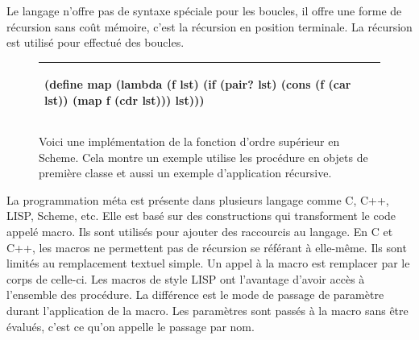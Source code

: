 Le langage n'offre pas de syntaxe spéciale pour les boucles, il offre une forme
de récursion sans coût mémoire, c'est la récursion en position terminale. La récursion
est utilisé pour effectué des boucles.



\begin{figure}[ht]
  \begin{center}
    \begin{tabular}{|l|}
      \hline
    \begin{mplisting}{0.65}
(define map
  (lambda (f lst)
    (if (pair? lst)
        (cons (f (car lst)) (map f (cdr lst)))
        lst)))
\end{mplisting}\\\hline
    \end{tabular}
  \end{center}
  \label{fig:fact1}
  \caption{Voici une implémentation de la fonction d'ordre supérieur  en Scheme.
  Cela montre un exemple utilise les procédure en objets de première classe et
  aussi un exemple d'application récursive.}
\end{figure}



La programmation méta est présente dans plusieurs langage comme C, C++, LISP,
Scheme, etc. Elle est basé sur des constructions qui transforment le code
appelé macro.  Ils sont utilisés pour ajouter des raccourcis au langage.  En C
et C++, les macros ne permettent pas de récursion se référant à elle-même.  Ils
sont limités au remplacement textuel simple. Un appel à la macro est remplacer
par le corps de celle-ci. Les macros de style LISP ont l'avantage d'avoir accès
à l'ensemble des procédure. La différence est le mode de passage de paramètre
durant l'application de la macro. Les paramètres sont passés à la macro sans
être évalués, c'est ce qu'on appelle le passage par nom.

